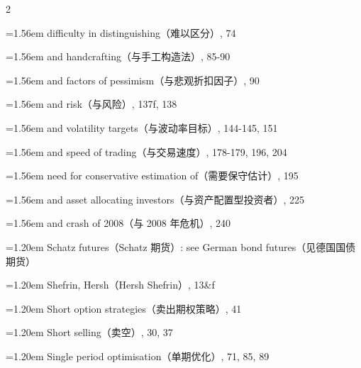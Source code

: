 {\begin{multicols}{2}
\par \noindent\hangindent=1.56em\hspace*{0.36em} difficulty in distinguishing（难以区分）, 74
\par \noindent\hangindent=1.56em\hspace*{0.36em} and handcrafting（与手工构造法）, 85-90
\par \noindent\hangindent=1.56em\hspace*{0.36em} and factors of pessimism（与悲观折扣因子）, 90
\par \noindent\hangindent=1.56em\hspace*{0.36em} and risk（与风险）, 137f, 138
\par \noindent\hangindent=1.56em\hspace*{0.36em} and volatility targets（与波动率目标）, 144-145, 151
\par \noindent\hangindent=1.56em\hspace*{0.36em} and speed of trading（与交易速度）, 178-179, 196, 204
\par \noindent\hangindent=1.56em\hspace*{0.36em} need for conservative estimation of（需要保守估计）, 195
\par \noindent\hangindent=1.56em\hspace*{0.36em} and asset allocating investors（与资产配置型投资者）, 225
\par \noindent\hangindent=1.56em\hspace*{0.36em} and crash of 2008（与 2008 年危机）, 240
\par \noindent\hangindent=1.20em\hspace*{0.00em} Schatz futures（Schatz 期货）: see German bond futures（见德国国债期货）
\par \noindent\hangindent=1.20em\hspace*{0.00em} Shefrin, Hersh（Hersh Shefrin）, 13\&f
\par \noindent\hangindent=1.20em\hspace*{0.00em} Short option strategies（卖出期权策略）, 41
\par \noindent\hangindent=1.20em\hspace*{0.00em} Short selling（卖空）, 30, 37
\par \noindent\hangindent=1.20em\hspace*{0.00em} Single period optimisation（单期优化）, 71, 85, 89

\end{multicols}}
